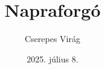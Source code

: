 \documentclass{book}
\begin{document}
\title{Napraforgó}
\author{Cserepes Virág}
\date{2025. július 8.}
\maketitle
\hulipsum
\end{document}
